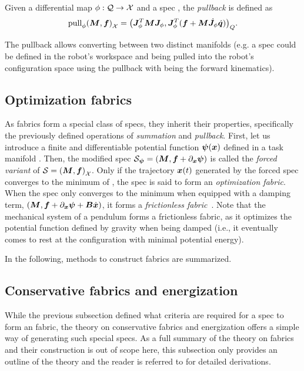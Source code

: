 Given a differential map $\phi: \mathcal{Q}\rightarrow\mathcal{X}$ and a spec
\spec{}, the \textit{pullback} is defined as
\begin{equation}
  \textrm{pull}_{\phi}{\left(\bm{M},\bm{f}\right)_{\mathcal{X}}} = {\left(\bm{J}^T_{\phi}\bm{M}\bm{J}_{\phi}, \bm{J}^T_{\phi}(\bm{f}+\bm{M}\dot{\bm{J}}_{\phi}\dot{\bm{q}})\right)}_{Q}.
  \label{eq:pullback}
\end{equation}

The pullback allows converting between two distinct
manifolds (e.g. a spec could be defined in the robot's
workspace and being pulled into the robot's configuration
space using the pullback with \map{} being the forward
kinematics).

\subsection{Optimization fabrics}%
\label{sub:optimization_fabrics}

As \ac{fabrics} form a special class of specs, they
inherit their properties, specifically the previously
defined operations of \textit{summation} and
\textit{pullback}. First, let us introduce a finite and
differentiable potential function $\bm{\psi}(\bm{x})$ defined in a
task manifold \X{}. Then, the modified spec $\mathcal{S}_{\bm{\psi}} =
\left(\bm{M},\bm{f} + \partial_{\bm{x}}\bm{\psi}\right)$ is called the
\textit{forced variant} of $\mathcal{S} = \left(\bm{M},\bm{f}\right)_{\mathcal{X}}$. Only if the
trajectory $\bm{x}(t)$ generated by the forced spec converges to
the minimum of \forc{}, the spec is said to form an
\textit{optimization fabric}. When the spec only converges
to the minimum when equipped with a damping term,
$\left(\bm{M},\bm{f} + \partial_{\bm{x}}\bm{\psi} + \bm{B}\dot{\bm{x}}\right)$, it
forms a \textit{frictionless fabric}~\cite[Definition
4.4]{Ratliff2020}. Note that the mechanical system of a
pendulum forms a frictionless fabric, as it optimizes the
potential function defined by gravity when being damped
(i.e., it eventually comes to rest at the configuration with
minimal potential energy).

In the following, methods to construct \ac{fabrics} are
summarized.

\subsection{Conservative fabrics and energization}%
\label{sub:conservative_fabrics_and_energization}

While the previous subsection defined what criteria are required for a spec to form
an \ac{fabric}, the theory on conservative fabrics and energization 
offers a simple way of generating such special specs. As a full summary of the theory
on \ac{fabrics} and their construction is out of scope here, this
subsection only provides an outline of the theory and the reader is referred to 
\cite{Ratliff2021,Wyk2022} for detailed derivations.

